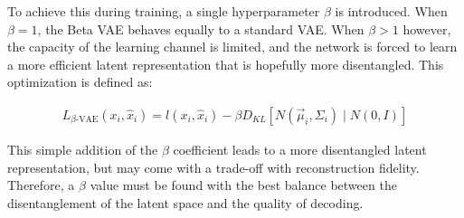 To achieve this during training, a single hyperparameter $\beta$ is
introduced. When $\beta = 1$, the Beta VAE behaves equally to a
standard VAE. When $\beta > 1$ however, the capacity of the learning
channel is limited, and the network is forced to learn a more
efficient latent representation that is hopefully more disentangled.
This optimization is defined as:

\begin{align*}
    L_{\beta \text{-VAE}}(x_i, \hat{x}_i) = l(x_i, \hat{x}_i) - \beta D_{KL}[N(\vec{\mu}_i, \Sigma_i) \mid N(0,I)]
\end{align*}

This simple addition of the $\beta$ coefficient leads to a more
disentangled latent representation, but may come with a trade-off
with reconstruction fidelity. Therefore, a $\beta$ value must be
found with the best balance between the disentanglement of the latent
space and the quality of decoding.